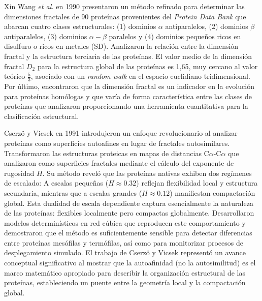 Xin Wang \textit{et al.} \cite{Wang1990} en 1990 presentaron un método refinado para determinar las dimensiones fractales de 90 proteínas provenientes del \textit{Protein Data Bank} que abarcan cuatro clases estructurales: (1) dominios $\alpha$ antiparalelos, (2) dominios $\beta$ antiparalelos, (3) dominios $\alpha-\beta$ paralelos y (4) dominios pequeños ricos en disulfuro o ricos en metales (SD). Analizaron la relación entre la dimensión fractal y la estructura terciaria de las proteínas. El valor medio de la dimensión fractal $D_{2}$ para la estructura global de las proteínas es 1,65, muy cercano al valor teórico $\frac{5}{3}$, asociado con un \textit{random walk} en el espacio euclidiano tridimensional. Por último, encontraron que la dimensión fractal es un indicador en la evolución para proteínas homólogas y que varía de forma característica entre las clases de proteínas que analizaron proporcionando una herramienta cuantitativa para la clasificación estructural.


Cserzö y Vicsek en 1991 \cite{Cserzo1991} introdujeron un enfoque revolucionario al analizar proteínas como superficies autoafines en lugar de fractales autosimilares. Transformaron las estructuras proteicas en mapas de distancias C$\alpha$-C$\alpha$ que analizaron como superficies fractales mediante el cálculo del exponente de rugosidad $H$. Su método reveló que las proteínas nativas exhiben dos regímenes de escalado: A escalas pequeñas ($H \approx 0.32$) reflejan flexibilidad local y estructura secundaria, mientras que a escalas grandes ($H \approx 0.12$) manifiestan compactación global. Esta dualidad de escala dependiente captura esencialmente la naturaleza de las proteínas: flexibles localmente pero compactas globalmente. Desarrollaron modelos determinísticos en red cúbica que reproducen este comportamiento y demostraron que el método es suficientemente sensible para detectar diferencias entre proteínas mesófilas y termófilas, así como para monitorizar procesos de desplegamiento simulado. El trabajo de Cserzö y Vicsek representó un avance conceptual significativo al mostrar que la autoafinidad (no la autosimilitud) es el marco matemático apropiado para describir la organización estructural de las proteínas, estableciendo un puente entre la geometría local y la compactación global.


